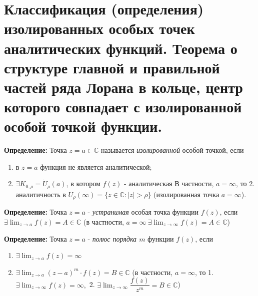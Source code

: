 \section{Классификация (определения) изолированных особых точек
аналитических функций. Теорема о структуре главной и правильной частей
ряда Лорана в кольце, центр которого совпадает с изолированной особой
точкой
функции.}\label{ux43aux43bux430ux441ux441ux438ux444ux438ux43aux430ux446ux438ux44f-ux43eux43fux440ux435ux434ux435ux43bux435ux43dux438ux44f-ux438ux437ux43eux43bux438ux440ux43eux432ux430ux43dux43dux44bux445-ux43eux441ux43eux431ux44bux445-ux442ux43eux447ux435ux43a-ux430ux43dux430ux43bux438ux442ux438ux447ux435ux441ux43aux438ux445-ux444ux443ux43dux43aux446ux438ux439.-ux442ux435ux43eux440ux435ux43cux430-ux43e-ux441ux442ux440ux443ux43aux442ux443ux440ux435-ux433ux43bux430ux432ux43dux43eux439-ux438-ux43fux440ux430ux432ux438ux43bux44cux43dux43eux439-ux447ux430ux441ux442ux435ux439-ux440ux44fux434ux430-ux43bux43eux440ux430ux43dux430-ux432-ux43aux43eux43bux44cux446ux435-ux446ux435ux43dux442ux440-ux43aux43eux442ux43eux440ux43eux433ux43e-ux441ux43eux432ux43fux430ux434ux430ux435ux442-ux441-ux438ux437ux43eux43bux438ux440ux43eux432ux430ux43dux43dux43eux439-ux43eux441ux43eux431ux43eux439-ux442ux43eux447ux43aux43eux439-ux444ux443ux43dux43aux446ux438ux438.}

\textbf{Определение:} Точка \(z=a\in \overline{\mathbb{C}}\) называется
\emph{изолированной} особой точкой, если

\begin{enumerate}
\def\labelenumi{\arabic{enumi}.}
\tightlist
\item
  в \(z=a\) функция не является аналитической;
\item
  \(\exists K_{0,\rho}=\dot{U}_{\rho}(a)\), в котором \(f(z)\) -
  аналитическая В частности, \(a=\infty\), то 2. аналитичность в
  \(U_{\rho}(\infty)=\{ z\in \mathbb{C}: |z|>\rho \}\) (изолированная
  точка \(a=\infty\)).
\end{enumerate}

\textbf{Определение:} Точка \(z=a\) - \emph{устранимая} особая точка
функции \(f(z)\), если \(\exists \lim_{ z \to a }f(z)=A\in \mathbb{C}\)
(в частности,
\(a=\infty \ \exists \lim_{ z \to \infty }f(z)=A\in \mathbb{C}\))

\textbf{Определение:} Точка \(z=a\) - \emph{полюс порядка \(m\)} функции
\(f(z)\), если

\begin{enumerate}
\def\labelenumi{\arabic{enumi}.}
\tightlist
\item
  \(\exists \lim_{ z \to a }f(z)=\infty\)
\item
  \(\exists \lim_{ z \to a }(z-a)^{m}\cdot f(z)=B\in \mathbb{C}\) (в
  частности, \(a=\infty\), то 1.
  \(\exists \lim_{ z \to \infty }f(z)=\infty,\) 2.
  \(\exists \lim_{ z \to \infty } \dfrac{f(z)}{z^{m}}=B\in \mathbb{C}\))
\end{enumerate}

